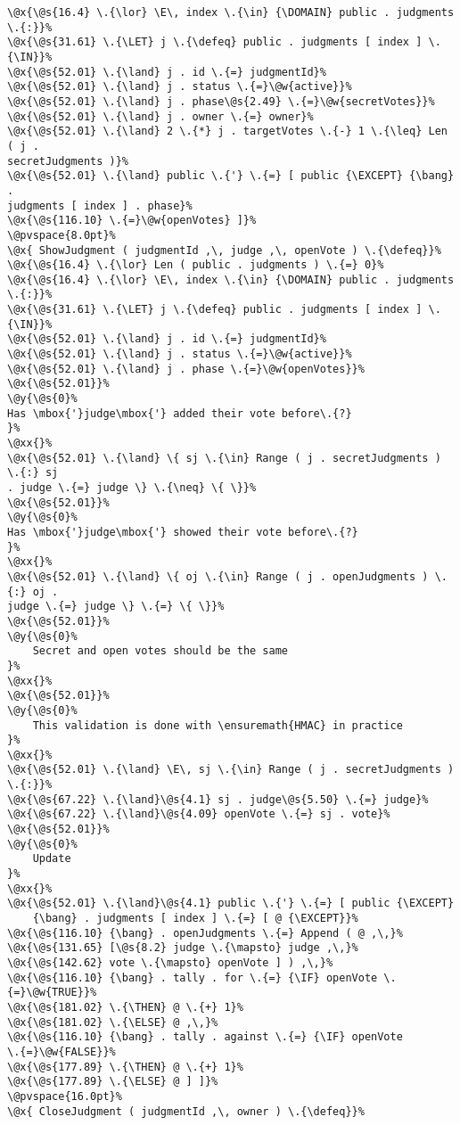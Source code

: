 \begin{lstlisting}[caption=TLA\textsuperscript+ model of chaincode, label=lst:ChaincodeModel]
\@x{\@s{16.4} \.{\lor} \E\, index \.{\in} {\DOMAIN} public . judgments \.{:}}%
\@x{\@s{31.61} \.{\LET} j \.{\defeq} public . judgments [ index ] \.{\IN}}%
\@x{\@s{52.01} \.{\land} j . id \.{=} judgmentId}%
\@x{\@s{52.01} \.{\land} j . status \.{=}\@w{active}}%
\@x{\@s{52.01} \.{\land} j . phase\@s{2.49} \.{=}\@w{secretVotes}}%
\@x{\@s{52.01} \.{\land} j . owner \.{=} owner}%
\@x{\@s{52.01} \.{\land} 2 \.{*} j . targetVotes \.{-} 1 \.{\leq} Len ( j .
secretJudgments )}%
\@x{\@s{52.01} \.{\land} public \.{'} \.{=} [ public {\EXCEPT} {\bang} .
judgments [ index ] . phase}%
\@x{\@s{116.10} \.{=}\@w{openVotes} ]}%
\@pvspace{8.0pt}%
\@x{ ShowJudgment ( judgmentId ,\, judge ,\, openVote ) \.{\defeq}}%
\@x{\@s{16.4} \.{\lor} Len ( public . judgments ) \.{=} 0}%
\@x{\@s{16.4} \.{\lor} \E\, index \.{\in} {\DOMAIN} public . judgments \.{:}}%
\@x{\@s{31.61} \.{\LET} j \.{\defeq} public . judgments [ index ] \.{\IN}}%
\@x{\@s{52.01} \.{\land} j . id \.{=} judgmentId}%
\@x{\@s{52.01} \.{\land} j . status \.{=}\@w{active}}%
\@x{\@s{52.01} \.{\land} j . phase \.{=}\@w{openVotes}}%
\@x{\@s{52.01}}%
\@y{\@s{0}%
Has \mbox{'}judge\mbox{'} added their vote before\.{?}
}%
\@xx{}%
\@x{\@s{52.01} \.{\land} \{ sj \.{\in} Range ( j . secretJudgments ) \.{:} sj
. judge \.{=} judge \} \.{\neq} \{ \}}%
\@x{\@s{52.01}}%
\@y{\@s{0}%
Has \mbox{'}judge\mbox{'} showed their vote before\.{?}
}%
\@xx{}%
\@x{\@s{52.01} \.{\land} \{ oj \.{\in} Range ( j . openJudgments ) \.{:} oj .
judge \.{=} judge \} \.{=} \{ \}}%
\@x{\@s{52.01}}%
\@y{\@s{0}%
    Secret and open votes should be the same
}%
\@xx{}%
\@x{\@s{52.01}}%
\@y{\@s{0}%
    This validation is done with \ensuremath{HMAC} in practice
}%
\@xx{}%
\@x{\@s{52.01} \.{\land} \E\, sj \.{\in} Range ( j . secretJudgments ) \.{:}}%
\@x{\@s{67.22} \.{\land}\@s{4.1} sj . judge\@s{5.50} \.{=} judge}%
\@x{\@s{67.22} \.{\land}\@s{4.09} openVote \.{=} sj . vote}%
\@x{\@s{52.01}}%
\@y{\@s{0}%
    Update
}%
\@xx{}%
\@x{\@s{52.01} \.{\land}\@s{4.1} public \.{'} \.{=} [ public {\EXCEPT}
    {\bang} . judgments [ index ] \.{=} [ @ {\EXCEPT}}%
\@x{\@s{116.10} {\bang} . openJudgments \.{=} Append ( @ ,\,}%
\@x{\@s{131.65} [\@s{8.2} judge \.{\mapsto} judge ,\,}%
\@x{\@s{142.62} vote \.{\mapsto} openVote ] ) ,\,}%
\@x{\@s{116.10} {\bang} . tally . for \.{=} {\IF} openVote \.{=}\@w{TRUE}}%
\@x{\@s{181.02} \.{\THEN} @ \.{+} 1}%
\@x{\@s{181.02} \.{\ELSE} @ ,\,}%
\@x{\@s{116.10} {\bang} . tally . against \.{=} {\IF} openVote
\.{=}\@w{FALSE}}%
\@x{\@s{177.89} \.{\THEN} @ \.{+} 1}%
\@x{\@s{177.89} \.{\ELSE} @ ] ]}%
\@pvspace{16.0pt}%
\@x{ CloseJudgment ( judgmentId ,\, owner ) \.{\defeq}}%

\end{lstlisting}
